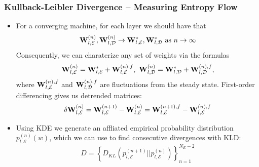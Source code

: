\documentclass[11pt,aspectratio=169]{beamer}
\newcommand{\parens}[1]{\left(#1\right)}
\newcommand{\bracks}[1]{\left\{#1\right\}}
\begin{document}
    \begin{frame}
        \frametitle{Kullback-Leibler Divergence -- Measuring Entropy Flow}
        \begin{itemize}
            \item 
            For a converging machine, for each layer
            we should have that
            \begin{equation}
                {\bf W}_{l,\mathcal{E}}^{(n)}, {\bf W}_{l,\mathcal{D}}^{(n)} \to 
                {\bf W}_{l,\mathcal{E}}^{*}, {\bf W}_{l,\mathcal{D}}^{*} \text{ as }
                n \to \infty \label{eqn:weight convergence}
            \end{equation}
            Consequently, we can charaterize any set of weights via the formulas
            \begin{equation}
                {\bf W}_{l,\mathcal{E}}^{(n)} = {\bf W}_{l,\mathcal{E}}^{*} + {\bf W}_{l,\mathcal{E}}^{(n),f},\
                {\bf W}_{l,\mathcal{D}}^{(n)} = {\bf W}_{l,\mathcal{D}}^{*} + {\bf W}_{l,\mathcal{D}}^{(n),f},
            \end{equation}
            where ${\bf W}_{l,\mathcal{E}}^{(n),f}$ and 
            ${\bf W}_{l,\mathcal{D}}^{(n),f}$ are fluctuations from the 
            steady state. First-order differencing gives us detrended matrices:
            \begin{equation}
                \delta{\bf W}_{l,\mathcal{E}}^{(n)} = {\bf W}_{l,\mathcal{E}}^{(n+1)} - {\bf W}_{l,\mathcal{E}}^{(n)}
                = {\bf W}_{l,\mathcal{E}}^{(n+1),f} - {\bf W}_{l,\mathcal{E}}^{(n),f}
            \end{equation}
            \item 
            Using KDE we generate an affliated empirical probability 
            distribution $p_{l,\mathcal{E}}^{(n)}(w)$, which we can use to find consecutive divergences with KLD:
            \begin{equation}
                D = \bracks{D_{KL}\parens{p_{l,\mathcal{E}}^{(n+1)} \Big|\!\Big| p_{l,\mathcal{E}}^{(n)}}}_{n=1}^{N_E - 2}
            \end{equation}
        \end{itemize}
    \end{frame}

\end{document}
